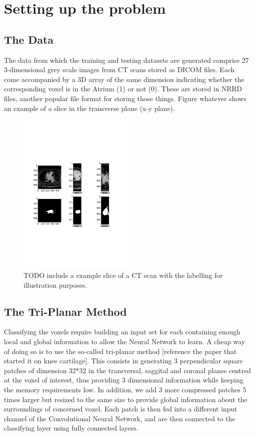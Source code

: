 \chapter{Setting up the problem}

\section{The Data}

The data from which the training and testing datasets are generated comprise 27 3-dimensional grey scale images from CT scans stored as DICOM files. Each come accompanied by a 3D array of the same dimension indicating whether the corresponding voxel is in the Atrium (1) or not (0). These are stored in NRRD files, another popular file format for storing those things. Figure whatever shows an example of a slice in the transverse plane (x-y plane). 

\begin{figure}
\centering
\includegraphics[trim=2cm 8cm 2cm 8cm, clip=true, height=80mm]{Chapter2/example_slice.pdf}
\caption{TODO include a example slice of a CT scan with the labelling for illustration purposes.}
\end{figure}

\section{The Tri-Planar Method}

Classifying the voxels require building an input set for each containing enough local and global information to allow the Neural Network to learn. A cheap way of doing so is to use the so-called tri-planar method [reference the paper that started it on knee cartilage]. This consists in generating 3 perpendicular square patches of dimension 32*32 in the transversal, saggital and coronal planes centred at the voxel of interest, thus providing 3 dimensional information while keeping the memory requirements low. In addition, we add 3 more compressed patches 5 times larger but resized to the same size to provide global information about the surroundings of concerned voxel. Each patch is then fed into a different input channel of the Convolutional Neural Network, and are then connected to the classifying layer using fully connected layers.


